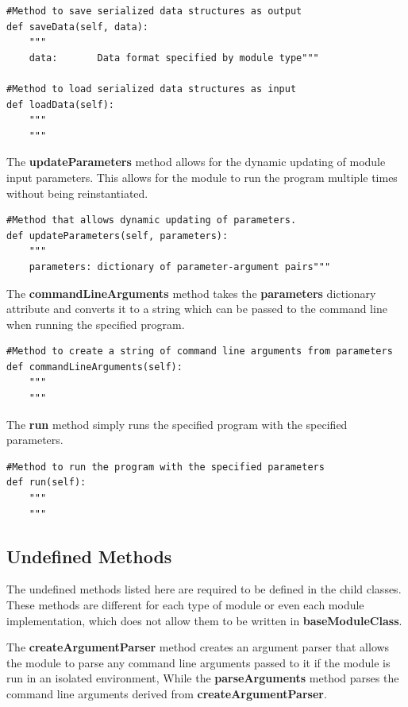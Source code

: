 \begin{lstlisting}[frame=single]        
#Method to save serialized data structures as output
def saveData(self, data):
	"""
	data:		Data format specified by module type"""
	
#Method to load serialized data structures as input
def loadData(self):
	"""
	"""
\end{lstlisting}

The \textbf{updateParameters} method allows for the dynamic updating of module input parameters. This allows for the module to run the program multiple times without being reinstantiated.

\begin{lstlisting}[frame=single]    
#Method that allows dynamic updating of parameters.
def updateParameters(self, parameters):
	"""
	parameters:	dictionary of parameter-argument pairs"""
\end{lstlisting}

The \textbf{commandLineArguments} method takes the \textbf{parameters} dictionary attribute and converts it to a string which can be passed to the command line when running the specified program.

\begin{lstlisting}[frame=single]
#Method to create a string of command line arguments from parameters
def commandLineArguments(self):
	"""
	"""
\end{lstlisting}

The \textbf{run} method simply runs the specified program with the specified parameters. 

\begin{lstlisting}[frame=single]    
#Method to run the program with the specified parameters
def run(self):
	"""
	"""
\end{lstlisting}

\subsection{Undefined Methods}

The undefined methods listed here are required to be defined in the child classes. These methods are different for each type of module or even each module implementation, which does not allow them to be written in \textbf{baseModuleClass}. 

The \textbf{createArgumentParser} method creates an argument parser that allows the module to parse any command line arguments passed to it if the module is run in an isolated environment, While the \textbf{parseArguments} method parses the command line arguments derived from \textbf{createArgumentParser}.

